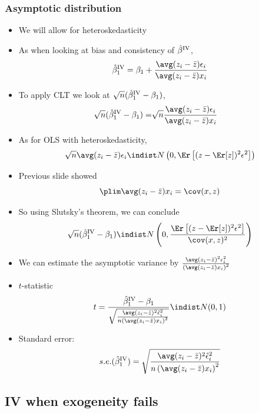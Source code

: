 \begin{frame}[allowframebreaks]
  \frametitle{Asymptotic distribution}
  \begin{itemize}
  \item We will allow for heteroskedasticity
  \item As when looking at bias and consistency of ${\hat{\beta}^{\mathrm{IV}}}$, 
    \[ \biv_1 = \beta_1 + \frac{ \avg (z_i - \bar{z}) \epsilon_i } 
    { \avg (z_i -\bar{z}) x_i } \]
  \item To apply CLT we look at $\sqrt{n}({\hat{\beta}^{\mathrm{IV}}}_1 - \beta_1)$,
    \begin{align*}
      \sqrt{n}(\biv_1 - \beta_1) = &  \sqrt{n} \frac{ \avg (z_i - \bar{z}) \epsilon_i } 
      { \avg (z_i -\bar{z}) x_i } 
    \end{align*}
  \item As for OLS with heteroskedasticity, 
    \[ \sqrt{n} \avg (z_i - \bar{z}) \epsilon_i \indist N\left(0,
      \Er\left[(z - \Er[z])^2 \epsilon^2 \right] \right) \]
  \item Previous slide showed 
    \[ \plim \avg (z_i -\bar{z}) x_i   = \cov(x,z) \]
  \item So using Slutsky's theorem, we can conclude
    \[ \sqrt{n}(\biv_1 - \beta_1)  \indist N \left( 0,
      \frac{\Er\left[(z - \Er[z])^2 \epsilon^2 \right]} {\cov(x,z)^2}
    \right) \]
  \item We can estimate the asymptotic variance by $\frac{ \avg(z_i -
      \bar{z})^2 \epsilon_i^2} {\left( \avg (z_i - \bar{z})
        x_i \right)^2} $
  \item $t$-statistic
    \[ t = \frac{\biv_1 - \beta_1}{\sqrt{ 
        \frac{ \avg(z_i - \bar{z})^2 \hat{\epsilon}_i^2} {n \left(
            \avg (z_i - \bar{z}) x_i \right)^2}}} \indist N(0,1) \] 
  \item Standard error:
    \[ s.e.(\biv_1) = \sqrt{ 
        \frac{ \avg(z_i - \bar{z})^2 \hat{\epsilon}_i^2} 
        {n \left( \avg (z_i - \bar{z}) x_i \right)^2}} \]
  \end{itemize}
\end{frame}

\subsection{IV when exogeneity fails}

